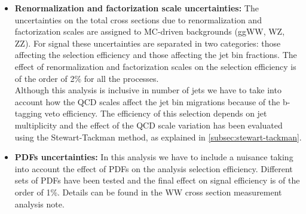 \begin{itemize}

\item {\bf Renormalization and factorization scale uncertainties:}
  The uncertainties on the total cross sections due to renormalization and factorization scales are assigned to MC-driven backgrounds (ggWW, WZ, ZZ).
  For signal these uncertainties are separated in two categories: those affecting the selection efficiency and those affecting the jet bin fractions.
  The effect of renormalization and factorization scales on the selection efficiency is of the order of 2\% for all the processes.\\
  Although this analysis is inclusive in number of jets we have to take into account how the QCD scales affect the jet bin migrations because of the b-tagging veto efficiency. The efficiency of this selection depends on jet multiplicity and the effect of the QCD scale variation has been evaluated using the Stewart-Tackman method, as explained in \ref{subsec:stewart-tackman}.
     
  
\item {\bf PDFs uncertainties:} 
  In this analysis we have to include a nuisance taking into account the effect of PDFs on the analysis selection efficiency.
  Different sets of PDFs have been tested and the final effect on signal efficiency is of the order of 1\%. Details can be found in the WW cross section measurement analysis note.


\end{itemize}
